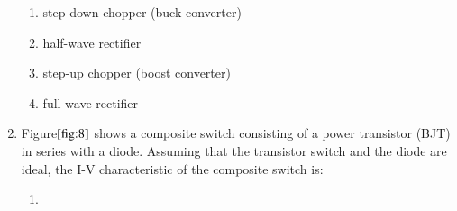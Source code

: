 \documentclass[journal]{IEEEtran}
\numberwithin{equation}{enumi}
\numberwithin{figure}{enumi}
\begin{document}
\begin{enumerate}
\begin{figure}[H]
			\centering
			
			\caption{}
			\label{fig:7}
		\end{figure}
    \begin{enumerate}
        \item step-down chopper (buck converter)
        \item half-wave rectifier
        \item step-up chopper (boost converter)
        \item full-wave rectifier
    \end{enumerate}

    \item Figure$\ref{fig:8}$ shows a composite switch consisting of a power transistor (BJT) in series with a diode. Assuming that the transistor switch and the diode are ideal, the I-V characteristic of the composite switch is:
    \begin{figure}[H]
    
			\centering
			
			\caption{}
			\label{fig:8}
		\end{figure}
    


\begin{enumerate}

    \item[]

    \begin{figure}[H]
        \centering


\end{figure}
\end{enumerate}
\end{enumerate}
\end{document}
